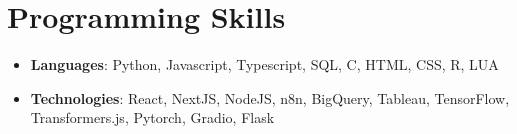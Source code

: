 \documentclass[letterpaper,10pt]{article}
\newcommand{\resumeSubHeadingListStart}{\begin{itemize}[leftmargin=*]}
\newcommand{\resumeSubHeadingListEnd}{\end{itemize}}
\begin{document}
\section*{Programming Skills}
\resumeSubHeadingListStart
  \item{
    \textbf{Languages}{: Python, Javascript, Typescript, SQL, C, HTML, CSS, R, LUA}
  }
  \item{
    \textbf{Technologies}{: React, NextJS, NodeJS, n8n, BigQuery, Tableau, TensorFlow, Transformers.js, Pytorch, Gradio, Flask}
  }
\resumeSubHeadingListEnd
\end{document}
